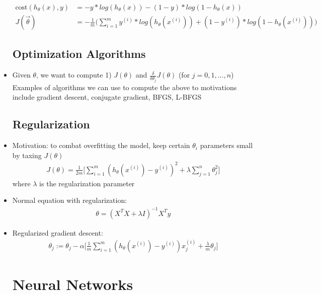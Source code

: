 \documentclass[titlepage]{article}
\begin{document}
\begin{itemize}
\begin{align*} 
\text{cost}(h_\theta(x),y) &= -y*log(h_\theta(x)) - (1-y)*log(1-h_\theta(x))\\
J(\vec{\theta}) &= -\frac{1}{m}\Big(\sum_{i=1}^{m} y^{(i)}*log(h_\theta(x^{(i)})) + (1-y^{(i)})*log(1-h_\theta(x^{(i)}))\Big)
\end{align*}

\subsection{Optimization Algorithms}
\item Given $\theta$, we want to compute 1) $J(\theta)$ and $\frac{\delta}{\delta \theta_j} J(\theta)$ (for $j=0,1,...,n$)
Examples of algorithms we can use to compute the above to motivations include gradient descent, conjugate gradient, BFGS, L-BFGS

\subsection{Regularization}
\item Motivation: to combat overfitting the model, keep certain $\theta_i$ parameters small by taxing $J(\theta)$
\begin{align*}
J(\theta) = \frac{1}{2m} \big[ \sum^{m}_{i=1} (h_\theta (x^{(i)}) - y^{(i)})^2 + \lambda \sum^{n}_{j=1} \theta_j^2 \big]
\end{align*}
where $\lambda$ is the regularization parameter

\item Normal equation with regularization: 
\begin{align*}
\theta = (X^TX + \lambda I)^{-1} X^Ty
\end{align*}

\item Regularized gradient descent:
\begin{align*}
\theta_j := \theta_j - \alpha \big[ \frac{1}{m}\sum^{m}_{i=1} (h_\theta (x^{(i)}) - y^{(i)})x_j^{(i)} + \frac{\lambda}{m} \theta_j \big]
\end{align*}
\section{Neural Networks}

\def\layersep{2.5cm}
\end{itemize}
\end{document}
